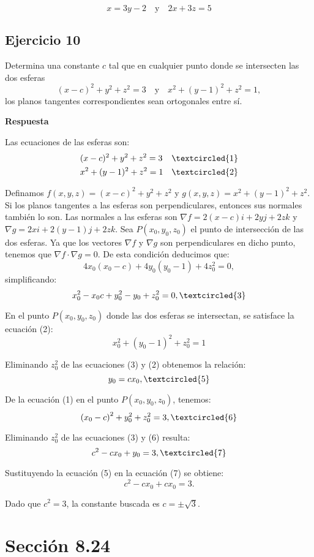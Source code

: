 \documentclass{report}
\begin{document}
    \[
    x = 3y - 2 \quad \text{y} \quad 2x + 3z = 5
    \]\subsection*{Ejercicio 10}
    Determina una constante $c$ tal que en cualquier punto donde se intersecten las dos esferas
    $$
    (x-c)^{2}+y^{2}+z^{2}=3 \quad \text{y} \quad x^{2}+(y-1)^{2}+z^{2}=1,
    $$
    los planos tangentes correspondientes sean ortogonales entre sí.

    \textbf{Respuesta}

    Las ecuaciones de las esferas son:
    $$
    \begin{aligned}
    & (x-c)^2+y^2+z^2=3 & \textcircled{1}\\
    & x^2+(y-1)^2+z^2=1 &\textcircled{2}
    \end{aligned}
    $$

    Definamos $f(x, y, z)=(x-c)^2+y^2+z^2$ y $g(x, y, z)=x^2+(y-1)^2+z^2$.
    Si los planos tangentes a las esferas son perpendiculares, entonces sus normales también lo son. Las normales a las esferas son $\nabla f=2(x-c)i+2 y j+2 z k$ y $\nabla g=2 x i+2(y-1) j+2 z k$. Sea $P\left(x_0, y_0, z_0\right)$ el punto de intersección de las dos esferas. Ya que los vectores $\nabla f $ y $ \nabla g$ son perpendiculares en dicho punto, tenemos que $\nabla f \cdot \nabla g=0$. De esta condición deducimos que:
    $$
    4 x_0\left(x_0-c\right)+4 y_0\left(y_0-1\right)+4 z_0^2=0,
    $$
    simplificando:
    $$
    x_0^2-x_0 c+y_0^2-y_0+z_0^2=0 , \textcircled{3}
    $$

    En el punto $P\left(x_0, y_0, z_0\right)$ donde las dos esferas se intersectan, se satisface la ecuación (2):
    $$
    x_0^2+\left(y_0-1\right)^2+z_0^2=1
    $$

    Eliminando $z_0^2$ de las ecuaciones (3) y (2) obtenemos la relación:
    $$
    y_0=c x_0 , \textcircled{5}
    $$

    De la ecuación (1) en el punto $P\left(x_0, y_0, z_0\right)$, tenemos:
    $$
    \left(x_0-c\right)^2+y_0^2+z_0^2=3 , \textcircled{6}
    $$

    Eliminando $z_0^2$ de las ecuaciones (3) y (6) resulta:
    $$
    c^2-c x_0+y_0=3 , \textcircled{7}
    $$

    Sustituyendo la ecuación (5) en la ecuación (7) se obtiene:
    $$
    c^2-c x_0+c x_0=3 .
    $$

    Dado que $c^2=3$, la constante buscada es $c= \pm \sqrt{3}$.
    \section*{Sección 8.24}
\end{document}
